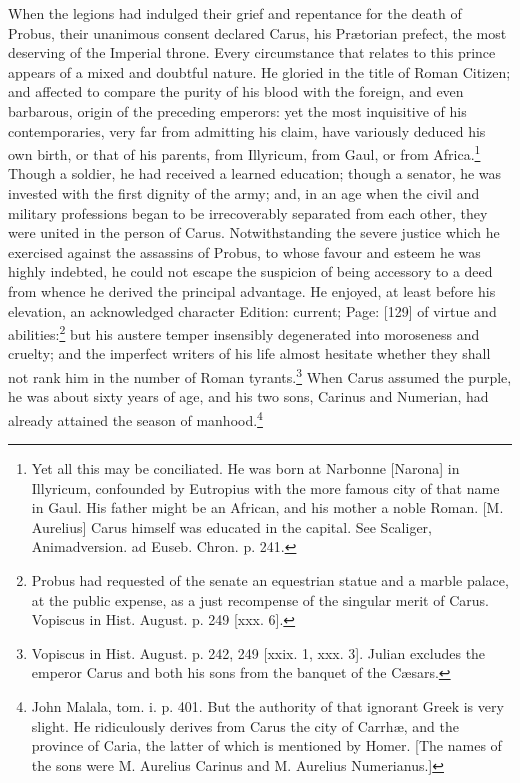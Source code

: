 When the legions had indulged their grief and repentance for the death of Probus, their unanimous consent declared Carus, his Prætorian prefect, the most deserving of the Imperial throne. Every circumstance that relates to this prince appears of a mixed and doubtful nature. He gloried in the title of Roman Citizen; and affected to compare the purity of his blood with the foreign, and even barbarous, origin of the preceding emperors: yet the most inquisitive of his contemporaries, very far from admitting his claim, have variously deduced his own birth, or that of his parents, from Illyricum, from Gaul, or from Africa.\footnote{Yet all this may be conciliated. He was born at Narbonne [Narona] in Illyricum, confounded by Eutropius with the more famous city of that name in Gaul. His father might be an African, and his mother a noble Roman. [M. Aurelius] Carus himself was educated in the capital. See Scaliger, Animadversion. ad Euseb. Chron. p. 241.} Though a soldier, he had received a learned education; though a senator, he was invested with the first dignity of the army; and, in an age when the civil and military professions began to be irrecoverably separated from each other, they were united in the person of Carus. Notwithstanding the severe justice which he exercised against the assassins of Probus, to whose favour and esteem he was highly indebted, he could not escape the suspicion of being accessory to a deed from whence he derived the principal advantage. He enjoyed, at least before his elevation, an acknowledged character Edition: current; Page: [129] of virtue and abilities:\footnote{Probus had requested of the senate an equestrian statue and a marble palace, at the public expense, as a just recompense of the singular merit of Carus. Vopiscus in Hist. August. p. 249 [xxx. 6].} but his austere temper insensibly degenerated into moroseness and cruelty; and the imperfect writers of his life almost hesitate whether they shall not rank him in the number of Roman tyrants.\footnote{Vopiscus in Hist. August. p. 242, 249 [xxix. 1, xxx. 3]. Julian excludes the emperor Carus and both his sons from the banquet of the Cæsars.} When Carus assumed the purple, he was about sixty years of age, and his two sons, Carinus and Numerian, had already attained the season of manhood.\footnote{John Malala, tom. i. p. 401. But the authority of that ignorant Greek is very slight. He ridiculously derives from Carus the city of Carrhæ, and the province of Caria, the latter of which is mentioned by Homer. [The names of the sons were M. Aurelius Carinus and M. Aurelius Numerianus.]}

